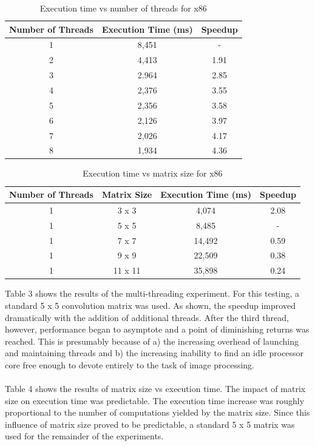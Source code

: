 \documentclass{article} %
\begin{document}
\begin{table}[h!]
\centering
\begin{tabular}{|c|c|c|}
\hline
\textbf{Number of Threads} & \textbf{Execution Time (ms)} & \textbf{Speedup} \\
\hline\hline
1 & 8,451 & - \\
2 & 4,413 & 1.91  \\
3 & 2.964 & 2.85  \\
4 & 2,376 & 3.55  \\
5 & 2,356 & 3.58  \\
6 & 2,126 & 3.97  \\
7 & 2,026 & 4.17  \\
8 & 1,934 & 4.36  \\
\hline
\end{tabular}
\caption{Execution time vs number of threads for x86}
\end{table}



\begin{table}[h!]
\centering
\begin{tabular}{|c|c|c|c|}
\hline
\textbf{Number of Threads} & \textbf{Matrix Size} & \textbf{Execution Time (ms)} & \textbf{Speedup} \\
\hline\hline
1 & 3 x 3 & 4,074 & 2.08 \\
1 & 5 x 5 & 8,485 & -  \\  
1 & 7 x 7 & 14,492 & 0.59 \\ 
1 & 9 x 9 & 22,509 &  0.38 \\ 
1 & 11 x 11 & 35,898 &  0.24\\ 
\hline
\end{tabular}
\caption{Execution time vs matrix size for x86}
\end{table}

Table 3 shows the results of the multi-threading experiment.  For this testing, a standard 5 x 5 convolution matrix was used. As shown, the speedup improved dramatically with the addition of additional threads.  After the third thread, however, performance began to asymptote and a point of diminishing returns was reached.  This is presumably because of a) the increasing overhead of launching and maintaining threads and b) the increasing inability to find an idle processor core free enough to devote entirely to the task of image processing.  \\
\\
Table 4 shows the results of matrix size vs execution time. The impact of matrix size on execution time was predictable.  The execution time increase  was roughly proportional to the number of computations yielded by the matrix size. Since this influence of matrix size proved to be predictable, a standard 5 x 5 matrix was used for the remainder of the experiments.\\
\end{document}
